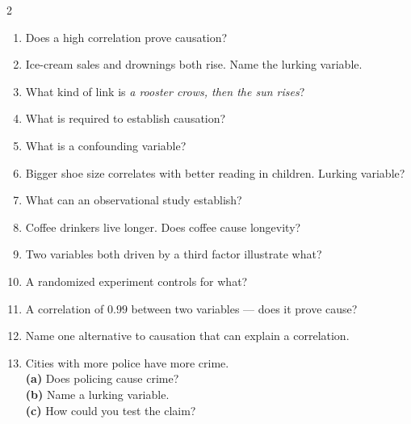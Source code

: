 \documentclass[11pt]{article}
\begin{document}
\clearpage
{}

\begin{recapbox}
\begin{multicols}{2}
\small
\begin{enumerate}[leftmargin=*,itemsep=3pt]
  \item Does a high correlation prove causation?
  \item Ice-cream sales and drownings both rise. Name the lurking variable.
  \item What kind of link is \emph{a rooster crows, then the sun rises}?
  \item What is required to establish causation?
  \item What is a confounding variable?
  \item Bigger shoe size correlates with better reading in children. Lurking variable?
  \item What can an observational study establish?
  \item Coffee drinkers live longer. Does coffee cause longevity?
  \item Two variables both driven by a third factor illustrate what?
  \item A randomized experiment controls for what?
  \item A correlation of $0.99$ between two variables --- does it prove cause?
  \item Name one alternative to causation that can explain a correlation.
  \item Cities with more police have more crime. \\ \textbf{(a)} Does policing cause crime? \\ \textbf{(b)} Name a lurking variable. \\ \textbf{(c)} How could you test the claim?
\end{enumerate}
\end{multicols}
\end{recapbox}
\end{document}

